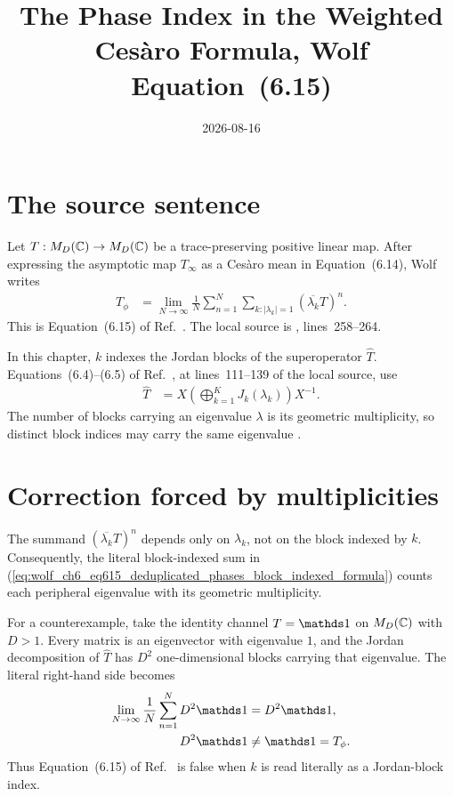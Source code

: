 \documentclass{article}
\title{The Phase Index in the Weighted Ces\`aro Formula, Wolf Equation~(6.15)}
\author{}
\date{2026-08-16}
\begin{document}
\maketitle
{}

\section{The source sentence}

Let $T:M_{D}(\mathbb{C})\to M_{D}(\mathbb{C})$ be a trace-preserving positive linear map. After
expressing the asymptotic map $T_\infty$ as a Ces\`aro mean in
Equation~(6.14), Wolf writes
\begin{align}
    T_\phi
        &=\lim_{N\to\infty}\frac{1}{N}
          \sum_{n=1}^{N}
          \sum_{k:\lvert\lambda_k\rvert=1}
          (\overline{\lambda_k}T)^n.
    \label{eq:wolf_ch6_eq615_deduplicated_phases_block_indexed_formula}
\end{align}
This is Equation~(6.15) of Ref.~\cite{Wolf2012Quantum}. The local source is
,
lines~258--264.

In this chapter, $k$ indexes the Jordan blocks of the superoperator
$\widehat T$. Equations~(6.4)--(6.5) of Ref.~\cite{Wolf2012Quantum}, at
lines~111--139 of the local source, use
\begin{align}
    \widehat T
        &=X\left(\bigoplus_{k=1}^{K}J_k(\lambda_k)\right)X^{-1}.
    \label{eq:wolf_ch6_eq615_deduplicated_phases_jordan_decomposition}
\end{align}
The number of blocks carrying an eigenvalue $\lambda$ is its geometric
multiplicity, so distinct block indices may carry the same eigenvalue
\cite[Chapter~6]{Wolf2012Quantum}.

\section{Correction forced by multiplicities}

The summand $(\overline{\lambda_k}T)^n$ depends only on $\lambda_k$, not on
the block indexed by $k$. Consequently, the literal block-indexed sum in
(\ref{eq:wolf_ch6_eq615_deduplicated_phases_block_indexed_formula}) counts
each peripheral eigenvalue with its geometric multiplicity.

For a counterexample, take the identity channel $T=\one$ on $M_{D}(\mathbb{C})$ with
$D>1$. Every matrix is an eigenvector with eigenvalue $1$, and the Jordan
decomposition of $\widehat T$ has $D^2$ one-dimensional blocks carrying that
eigenvalue. The literal right-hand side becomes
\begin{align}
    \lim_{N\to\infty}\frac{1}{N}
        \sum_{n=1}^{N}D^2\one
        &=D^2\one,
    \label{eq:wolf_ch6_eq615_deduplicated_phases_identity_block_sum}\\
    D^2\one
        &\neq \one=T_\phi.
    \label{eq:wolf_ch6_eq615_deduplicated_phases_identity_contradiction}
\end{align}
Thus Equation~(6.15) of Ref.~\cite{Wolf2012Quantum} is false when $k$ is
read literally as a Jordan-block index.
\end{document}
